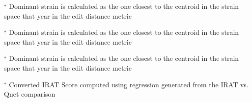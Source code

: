 
\begin{table}\centering
{}\label{tabrec9}

\sffamily\fontsize{7}{8}\selectfont


\flushleft

\fontsize{7}{7}\selectfont
$^\star$ Dominant strain is calculated as the one closest to the centroid in the strain space that year in the edit distance metric
\end{table}


\begin{table}\centering
{}\label{tabrec10}

\sffamily\fontsize{7}{8}\selectfont


\flushleft

\fontsize{7}{7}\selectfont
$^\star$ Dominant strain is calculated as the one closest to the centroid in the strain space that year in the edit distance metric
\end{table}


\begin{table}\centering
{}\label{tabrec11}

\sffamily\fontsize{7}{8}\selectfont


\flushleft

\fontsize{7}{7}\selectfont
$^\star$ Dominant strain is calculated as the one closest to the centroid in the strain space that year in the edit distance metric
\end{table}





\begin{table}\centering
{}\label{tabrec11}

\sffamily\fontsize{7}{8}\selectfont


\flushleft

\fontsize{7}{7}\selectfont
$^\star$ Converted IRAT Score computed using regression generated from the IRAT vs. Qnet comparison
\end{table}





